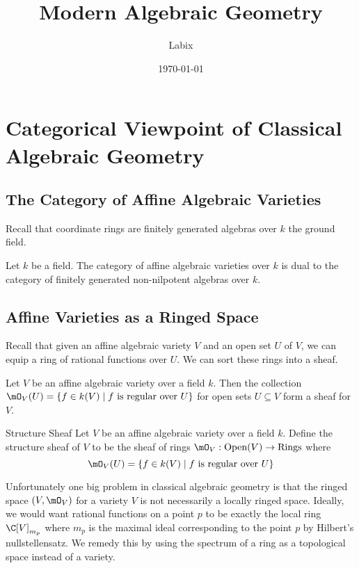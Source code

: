 \documentclass[a4paper]{article}
\title{Modern Algebraic Geometry}
\author{Labix}
\date{\today}
\begin{document}
\maketitle
\begin{abstract}
\end{abstract}
\pagebreak
\tableofcontents
\pagebreak

\section{Categorical Viewpoint of Classical Algebraic Geometry}
\subsection{The Category of Affine Algebraic Varieties}
Recall that coordinate rings are finitely generated algebras over $k$ the ground field. 

\begin{thm}{}{} Let $k$ be a field. The category of affine algebraic varieties over $k$ is dual to the category of finitely generated non-nilpotent algebras over $k$. 
\end{thm}

\subsection{Affine Varieties as a Ringed Space}
Recall that given an affine algebraic variety $V$ and an open set $U$ of $V$, we can equip a ring of rational functions over $U$. We can sort these rings into a sheaf. 

\begin{prp}{}{} Let $V$ be an affine algebraic variety over a field $k$. Then the collection $\mO_V(U)=\{f\in k(V)\;|\;f\text{ is regular over }U\}$ for open sets $U\subseteq V$ form a sheaf for $V$. 
\end{prp}

\begin{defn}{Structure Sheaf}{} Let $V$ be an affine algebraic variety over a field $k$. Define the structure sheaf of $V$ to be the sheaf of rings $\mO_V:\text{Open}(V)\to\text{Rings}$ where $$\mO_V(U)=\{f\in k(V)\;|\;f\text{ is regular over }U\}$$
\end{defn}

Unfortunately one big problem in classical algebraic geometry is that the ringed space $(V,\mO_V)$ for a variety $V$ is not necessarily a locally ringed space. Ideally, we would want rational functions on a point $p$ to be exactly the local ring $\C[V]_{m_p}$ where $m_p$ is the maximal ideal corresponding to the point $p$ by Hilbert's nullstellensatz. We remedy this by using the spectrum of a ring as a topological space instead of a variety. 
\end{document}
